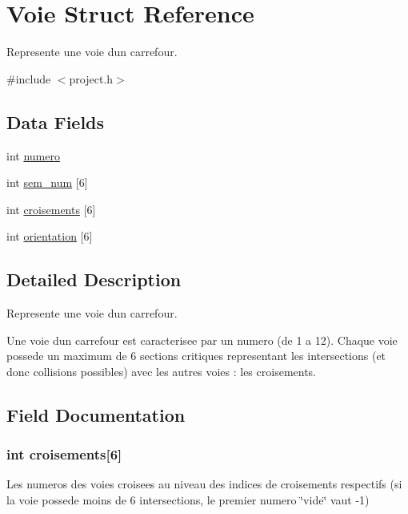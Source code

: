 \hypertarget{struct_voie}{}\section{Voie Struct Reference}
\label{struct_voie}


Represente une voie d\textquotesingle{}un carrefour.  




{\ttfamily \#include $<$project.\+h$>$}

\subsection*{Data Fields}
\begin{DoxyCompactItemize}
\item 
int \hyperlink{struct_voie_a2c30f43104974e72e2809fb4569804b0}{numero}
\item 
int \hyperlink{struct_voie_ac9436ae55f35dfc5e3dc8e676c73aeb5}{sem\+\_\+num} \mbox{[}6\mbox{]}
\item 
int \hyperlink{struct_voie_ae6c4a614ad59b4d83fc3001ff282a26b}{croisements} \mbox{[}6\mbox{]}
\item 
int \hyperlink{struct_voie_a8c475c65666c2d5959930d639989450c}{orientation} \mbox{[}6\mbox{]}
\end{DoxyCompactItemize}


\subsection{Detailed Description}
Represente une voie d\textquotesingle{}un carrefour. 

Une voie d\textquotesingle{}un carrefour est caracterisee par un numero (de 1 a 12). Chaque voie possede un maximum de 6 sections critiques representant les intersections (et donc collisions possibles) avec les autres voies \+: les croisements. 

\subsection{Field Documentation}
\hypertarget{struct_voie_ae6c4a614ad59b4d83fc3001ff282a26b}{}
\subsubsection[{croisements}]{\setlength{\rightskip}{0pt plus 5cm}int croisements\mbox{[}6\mbox{]}}\label{struct_voie_ae6c4a614ad59b4d83fc3001ff282a26b}
Les numeros des voies croisees au niveau des indices de croisements respectifs (si la voie possede moins de 6 intersections, le premier numero \char`\"{}vide\char`\"{} vaut -\/1) \hypertarget{struct_voie_a2c30f43104974e72e2809fb4569804b0}{}
